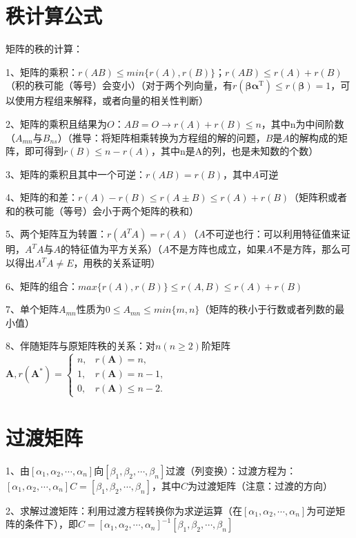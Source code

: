 \section{秩计算公式}

矩阵的秩的计算：

1、矩阵的乘积：$r(AB) \leqslant min\{r(A),r(B)\}$；$r(AB) \leqslant r(A)+r(B)$（积的秩可能（等号）会变小）（对于两个列向量，有$r\left(\boldsymbol{\beta} \boldsymbol{\alpha}^{\mathrm{T}}\right) \leqslant r(\boldsymbol{\beta})=1$，可以使用方程组来解释，或者向量的相关性判断）

2、矩阵的乘积且结果为$O$：$AB=O \rightarrow r(A)+r(B) \leqslant n$，其中n为中间阶数（$A_{mn}$与$B_{ns}$）（推导：将矩阵相乘转换为方程组的解的问题，$B$是$A$的解构成的矩阵，即可得到$r(B)\leqslant n - r(A) $，其中n是A的列，也是未知数的个数）

3、矩阵的乘积且其中一个可逆：$r(AB)=r(B)$，其中$A$可逆

4、矩阵的和差：$r(A)-r(B)\leqslant r(A\pm B) \leqslant r(A)+r(B)$（矩阵积或者和的秩可能（等号）会小于两个矩阵的秩和）

5、两个矩阵互为转置：$r(A^TA)= r(A)$（$A$不可逆也行：可以利用特征值来证明，$A^TA$与$A$的特征值为平方关系）（$A$不是方阵也成立，如果$A$不是方阵，那么可以得出$A^TA \ne E$，用秩的关系证明）

6、矩阵的组合：$max\{r(A),r(B)\}  \leqslant r(A,B) \leqslant r(A)+r(B)$

7、单个矩阵$A_{mn}$性质为$0 \leqslant A_{mn} \leqslant min\{ m,n \}$（矩阵的秩小于行数或者列数的最小值）

8、伴随矩阵与原矩阵秩的关系：对$n(n \geqslant 2)$阶矩阵$\boldsymbol{A}, r\left(\boldsymbol{A}^{*}\right)= \begin{cases}n, & r(\boldsymbol{A})=n, \\ 1, & r(\boldsymbol{A})=n-1, \\ 0, & r(\boldsymbol{A}) \leqslant n-2 .\end{cases}$

\section{过渡矩阵}

1、由$[\alpha_1,\alpha_2,\cdots,\alpha_n]$向$[\beta_1,\beta_2,\cdots,\beta_n]$过渡（列变换）：过渡方程为：$[\alpha_1,\alpha_2,\cdots,\alpha_n]C=[\beta_1,\beta_2,\cdots,\beta_n]$，其中$C$为过渡矩阵（注意：过渡的方向）

2、求解过渡矩阵：利用过渡方程转换你为求逆运算（在$[\alpha_1,\alpha_2,\cdots,\alpha_n]$为可逆矩阵的条件下），即$C=[\alpha_1,\alpha_2,\cdots,\alpha_n]^{-1}[\beta_1,\beta_2,\cdots,\beta_n]$

